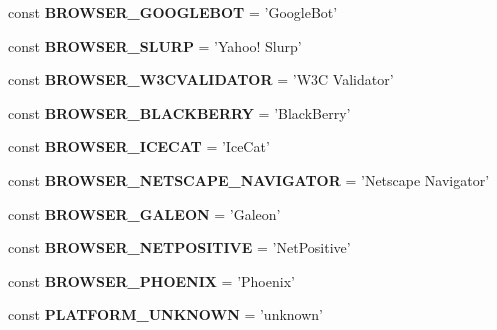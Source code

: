 \begin{DoxyCompactItemize}
\item 
\hypertarget{class_browser_a326a7157ebdee2d55900fbf433138c98}{
const {\bfseries BROWSER\_\-GOOGLEBOT} = 'GoogleBot'}
\label{class_browser_a326a7157ebdee2d55900fbf433138c98}

\item 
\hypertarget{class_browser_a696c58da0d5b26064ce3aff472786444}{
const {\bfseries BROWSER\_\-SLURP} = 'Yahoo! Slurp'}
\label{class_browser_a696c58da0d5b26064ce3aff472786444}

\item 
\hypertarget{class_browser_acace957435dc5c260e09bc84579b69a6}{
const {\bfseries BROWSER\_\-W3CVALIDATOR} = 'W3C Validator'}
\label{class_browser_acace957435dc5c260e09bc84579b69a6}

\item 
\hypertarget{class_browser_a3703c1214d67f9681c5b8eb1df224d26}{
const {\bfseries BROWSER\_\-BLACKBERRY} = 'BlackBerry'}
\label{class_browser_a3703c1214d67f9681c5b8eb1df224d26}

\item 
\hypertarget{class_browser_a9643e00dcf124ae72fe93512f5c54503}{
const {\bfseries BROWSER\_\-ICECAT} = 'IceCat'}
\label{class_browser_a9643e00dcf124ae72fe93512f5c54503}

\item 
\hypertarget{class_browser_a8c8132fdf048d0773d6b1575fcebfb94}{
const {\bfseries BROWSER\_\-NETSCAPE\_\-NAVIGATOR} = 'Netscape Navigator'}
\label{class_browser_a8c8132fdf048d0773d6b1575fcebfb94}

\item 
\hypertarget{class_browser_a19ddab3737ee6c2eb5b00a68fde42e9f}{
const {\bfseries BROWSER\_\-GALEON} = 'Galeon'}
\label{class_browser_a19ddab3737ee6c2eb5b00a68fde42e9f}

\item 
\hypertarget{class_browser_ae527ab0d8e630cf56af0e971f5451eef}{
const {\bfseries BROWSER\_\-NETPOSITIVE} = 'NetPositive'}
\label{class_browser_ae527ab0d8e630cf56af0e971f5451eef}

\item 
\hypertarget{class_browser_a0317e1e8edeb386e1c9462ae41066531}{
const {\bfseries BROWSER\_\-PHOENIX} = 'Phoenix'}
\label{class_browser_a0317e1e8edeb386e1c9462ae41066531}

\item 
\hypertarget{class_browser_accef07ce51a91b7e9bd2a7949176b882}{
const {\bfseries PLATFORM\_\-UNKNOWN} = 'unknown'}
\label{class_browser_accef07ce51a91b7e9bd2a7949176b882}


\end{DoxyCompactItemize}
